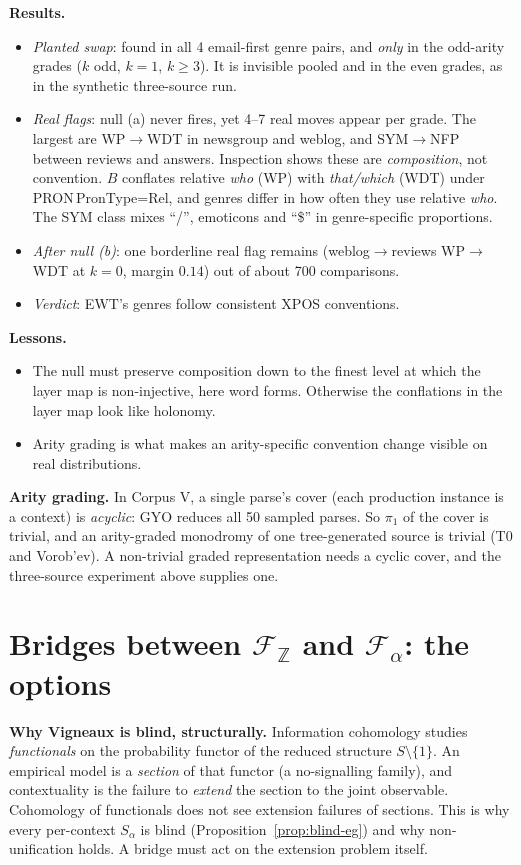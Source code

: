 \documentclass[11pt]{article}
\theoremstyle{definition}
\theoremstyle{remark}
\newcommand{\Z}{\mathbb{Z}}
\begin{document}
\textbf{Results.}
\begin{itemize}
  \item \emph{Planted swap}: found in all 4 email-first genre pairs, and \emph{only} in the odd-arity grades ($k$ odd, $k=1$, $k\ge3$). It is invisible pooled and in the even grades, as in the synthetic three-source run.
  \item \emph{Real flags}: null (a) never fires, yet 4--7 real moves appear per grade. The largest are WP$\to$WDT in newsgroup and weblog, and SYM$\to$NFP between reviews and answers. Inspection shows these are \emph{composition}, not convention. $B$ conflates relative \emph{who} (WP) with \emph{that/which} (WDT) under PRON\,PronType=Rel, and genres differ in how often they use relative \emph{who}. The SYM class mixes ``/'', emoticons and ``\$'' in genre-specific proportions.
  \item \emph{After null (b)}: one borderline real flag remains (weblog$\to$reviews WP$\to$WDT at $k=0$, margin $0.14$) out of about 700 comparisons.
  \item \emph{Verdict}: EWT's genres follow consistent XPOS conventions.
\end{itemize}

\textbf{Lessons.}
\begin{itemize}
  \item The null must preserve composition down to the finest level at which the layer map is non-injective, here word forms. Otherwise the conflations in the layer map look like holonomy.
  \item Arity grading is what makes an arity-specific convention change visible on real distributions.
\end{itemize}

\noindent\textbf{Arity grading.} In Corpus V, a single parse's cover (each production instance is a context) is \emph{acyclic}: GYO reduces all 50 sampled parses. So $\pi_1$ of the cover is trivial, and an arity-graded monodromy of one tree-generated source is trivial (T0 and Vorob'ev). A non-trivial graded representation needs a cyclic cover, and the three-source experiment above supplies one.

\section{Bridges between $\mathcal F_{\Z}$ and $\mathcal F_\alpha$: the options}\label{sec:bridges}
\textbf{Why Vigneaux is blind, structurally.} Information cohomology studies \emph{functionals} on the probability functor of the reduced structure $S\setminus\{1\}$. An empirical model is a \emph{section} of that functor (a no-signalling family), and contextuality is the failure to \emph{extend} the section to the joint observable. Cohomology of functionals does not see extension failures of sections. This is why every per-context $S_\alpha$ is blind (Proposition~\ref{prop:blind-eg}) and why non-unification holds. A bridge must act on the extension problem itself.
\end{document}

